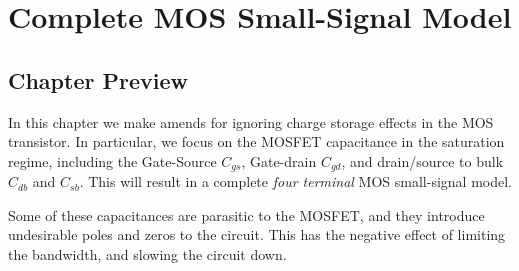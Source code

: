 \chapter{Complete MOS Small-Signal Model}
\label{ch:ch10_mos_ss_ac}
\graphicspath{{./figs_mos_ss_ac/}}
\section{Chapter Preview}
In this chapter we make amends for ignoring charge storage effects in the MOS transistor.  In particular, we focus on the MOSFET capacitance in the saturation regime, including the Gate-Source $C_{gs}$, Gate-drain $C_{gd}$, and drain/source to bulk $C_{db}$ and $C_{sb}$.  This will result in a complete \emph{four terminal} MOS small-signal model.

Some of these capacitances are parasitic to the MOSFET, and they introduce undesirable poles and zeros to the circuit.  This has the negative effect of limiting the bandwidth, and slowing the circuit down.

